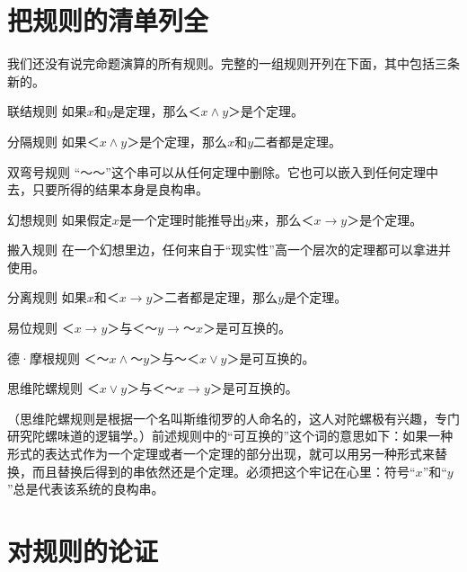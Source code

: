 \section{把规则的清单列全}

我们还没有说完命题演算的所有规则。完整的一组规则开列在下面，其中包括三条新的。

\begin{thm}{联结规则}
如果$x$和$y$是定理，那么$＜x∧y＞$是个定理。
\end{thm}

\begin{thm}{分隔规则}
如果$＜x∧y＞$是个定理，那么$x$和$y$二者都是定理。
\end{thm}

\begin{thm}{双弯号规则}
“$～～$”这个串可以从任何定理中删除。它也可以嵌入到任何定理中去，只要所得的结果本身是良构串。
\end{thm}

\begin{thm}{幻想规则}
如果假定$x$是一个定理时能推导出$y$来，那么$＜x→y＞$是个定理。
\end{thm}

\begin{thm}{搬入规则}
在一个幻想里边，任何来自于“现实性”高一个层次的定理都可以拿进并使用。
\end{thm}

\begin{thm}{分离规则}
如果$x$和$＜x→y＞$二者都是定理，那么$y$是个定理。
\end{thm}

\begin{thm}{易位规则}
$＜x→y＞$与$＜～y→～x＞$是可互换的。
\end{thm}

\begin{thm}{德·摩根规则}
$＜～x∧～y＞$与$～＜x∨y＞$是可互换的。
\end{thm}

\begin{thm}{思维陀螺规则}
$＜x∨y＞$与$＜～x→y＞$是可互换的。
\end{thm}
（思维陀螺规则是根据一个名叫斯维彻罗的人命名的，这人对陀螺极有兴趣，专门研究陀螺味道的逻辑学。）前述规则中的“可互换的”这个词的意思如下：如果一种形式的表达式作为一个定理或者一个定理的部分出现，就可以用另一种形式来替换，而且替换后得到的串依然还是个定理。必须把这个牢记在心里：符号“$x$”和“$y$”总是代表该系统的良构串。

\section{对规则的论证}

